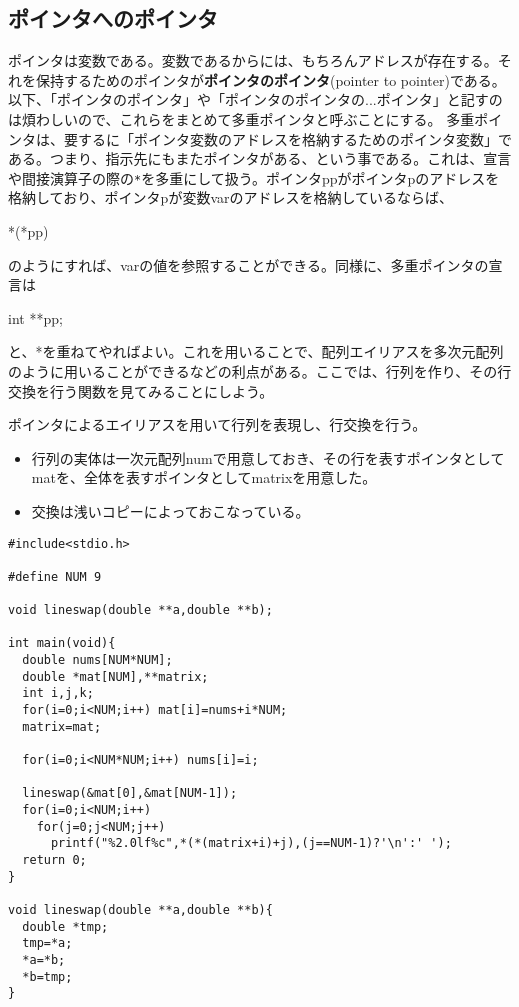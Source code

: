 \subsection{ポインタへのポインタ}
ポインタは変数である。変数であるからには、もちろんアドレスが存在する。それを保持するためのポインタが\textbf{ポインタのポインタ}(pointer to pointer)である。以下、「ポインタのポインタ」や「ポインタのポインタの...ポインタ」と記すのは煩わしいので、これらをまとめて多重ポインタと呼ぶことにする。
多重ポインタは、要するに「ポインタ変数のアドレスを格納するためのポインタ変数」である。つまり、指示先にもまたポインタがある、という事である。これは、宣言や間接演算子の際の\verb|*|を多重にして扱う。ポインタppがポインタpのアドレスを格納しており、ポインタpが変数varのアドレスを格納しているならば、
\begin{code}
*(*pp)
\end{code}
のようにすれば、varの値を参照することができる。同様に、多重ポインタの宣言は
\begin{code}
int **pp;
\end{code}
と、*を重ねてやればよい。これを用いることで、配列エイリアスを多次元配列のように用いることができるなどの利点がある。ここでは、行列を作り、その行交換を行う関数を見てみることにしよう。
\begin{boxnote}
ポインタによるエイリアスを用いて行列を表現し、行交換を行う。
\begin{itemize}
\item 行列の実体は一次元配列numで用意しておき、その行を表すポインタとしてmatを、全体を表すポインタとしてmatrixを用意した。
\item 交換は浅いコピーによっておこなっている。
\end{itemize}
\end{boxnote}
\begin{boxnote}
\begin{lstlisting}[caption=行列の表現例と行交換,label=program11_5]
#include<stdio.h>

#define NUM 9

void lineswap(double **a,double **b);

int main(void){
  double nums[NUM*NUM];
  double *mat[NUM],**matrix;
  int i,j,k;
  for(i=0;i<NUM;i++) mat[i]=nums+i*NUM;
  matrix=mat;

  for(i=0;i<NUM*NUM;i++) nums[i]=i;
  
  lineswap(&mat[0],&mat[NUM-1]);
  for(i=0;i<NUM;i++)
    for(j=0;j<NUM;j++)
      printf("%2.0lf%c",*(*(matrix+i)+j),(j==NUM-1)?'\n':' ');
  return 0;
}

void lineswap(double **a,double **b){
  double *tmp;
  tmp=*a;
  *a=*b;
  *b=tmp;
}

\end{lstlisting}
\end{boxnote}

